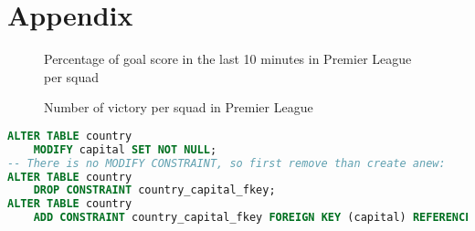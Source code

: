 \documentclass[a4paper,15pt]{article}
\begin{document}
\section{Appendix}

\begin{figure}[!htbp]
    \centering
        \caption{Percentage of goal score in the last 10 minutes in Premier League per squad}
\end{figure}

\mydata
    
\begin{figure}[!htbp]
    \centering
        \caption{Number of victory per squad in Premier League}
\end{figure}

\newpage

\begin{lstlisting}[language=SQL, style=sqlStyle]
ALTER TABLE country
	MODIFY capital SET NOT NULL;
-- There is no MODIFY CONSTRAINT, so first remove than create anew:
ALTER TABLE country
	DROP CONSTRAINT country_capital_fkey;
ALTER TABLE country
	ADD CONSTRAINT country_capital_fkey FOREIGN KEY (capital) REFERENCES city(id) ON DELETE CASCADE;
\end{lstlisting}
\end{document}
